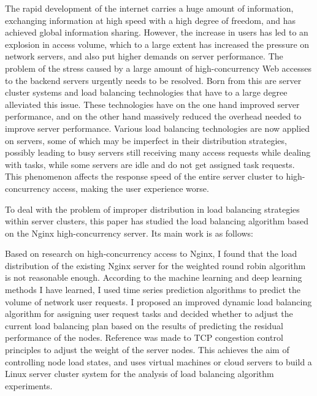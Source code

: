 \begin{eabstract} 
The rapid development of the internet carries a huge amount of information, 
exchanging information at high speed with a high degree of freedom, and has achieved global information sharing.
However, the increase in users has led to an explosion in access volume, 
which to a large extent has increased the pressure on network servers, and also put higher demands on server performance.
The problem of the stress caused by a large amount of high-concurrency Web accesses to the backend servers urgently needs to be resolved. 
Born from this are server cluster systems and load balancing technologies that have to a large degree alleviated this issue. 
These technologies have on the one hand improved server performance, and on the other hand massively reduced the overhead needed to improve server performance. 
Various load balancing technologies are now applied on servers, some of which may be imperfect in their distribution strategies, 
possibly leading to busy servers still receiving many access requests while dealing with tasks, 
while some servers are idle and do not get assigned task requests. 
This phenomenon affects the response speed of the entire server cluster to high-concurrency access, 
making the user experience worse.

To deal with the problem of improper distribution in load balancing strategies within server clusters, 
this paper has studied the load balancing algorithm based on the Nginx high-concurrency server.
Its main work is as follows:

Based on research on high-concurrency access to Nginx,
I found that the load distribution of the existing Nginx server for the weighted round robin algorithm is not reasonable enough.
According to the machine learning and deep learning methods I have learned, 
I used time series prediction algorithms to predict the volume of network user requests.
I proposed an improved dynamic load balancing algorithm for assigning user request tasks and decided whether to adjust the current load balancing plan based on the results of predicting the residual performance of the nodes.
Reference was made to TCP congestion control principles to adjust the weight of the server nodes.
This achieves the aim of controlling node load states,
and uses virtual machines or cloud servers to build a Linux server cluster system for the analysis of load balancing algorithm experiments.
\end{eabstract}

